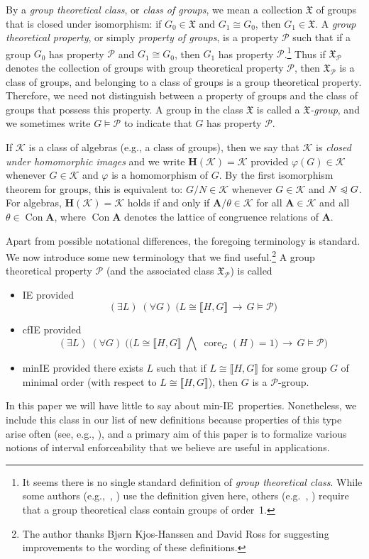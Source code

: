 \documentclass{gen-j-l}
\newcommand{\lb}{\ensuremath{\llbracket}}
\newcommand{\rb}{\ensuremath{\rrbracket}}
\newcommand{\<}{\ensuremath{\langle}}
\renewcommand{\>}{\ensuremath{\rangle}}
\theoremstyle{plain}
\theoremstyle{definition}
\theoremstyle{remark}
\numberwithin{theorem}{section}
\numberwithin{claim}{section}
\numberwithin{equation}{section}
\numberwithin{conjecture}{section}
\newcommand{\defn}[1]{\emph{#1}}
\newcommand{\subnormal}{\ensuremath{\trianglelefteqslant}}
\newcommand{\Meet}{\ensuremath{\bigwedge}}
\newcommand{\Con}{\ensuremath{\operatorname{Con}}}
\newcommand{\core}{\ensuremath{\operatorname{core}}}
\newcommand{\2}{\ensuremath{\mathbf{2}}}
\newcommand{\3}{\ensuremath{\mathbf{3}}}
\newcommand{\bA}{\ensuremath{\mathbf{A}}}
\newcommand{\sG}{\ensuremath{\mathfrak{X}}}
\newcommand{\bH}{\ensuremath{\mathbf{H}}}
\newcommand{\sK}{\ensuremath{\mathscr{K}}}
\newcommand{\cP}{\ensuremath{\mathcal{P}}}
\newcommand{\IE}{{\small IE}}
\renewcommand{\phi}{\ensuremath{\varphi}}
\begin{document}
By a \defn{group theoretical class}, or \defn{class of groups}, we mean a
collection $\sG$ of groups that is closed under isomorphism:
if $G_0\in \sG$ and  $G_1\cong G_0$, then $G_1\in \sG$.
A \defn{group theoretical property}, or simply \defn{property of groups},
is a property $\cP$ such that if a group $G_0$ has property $\cP$ and
$G_1\cong G_0$, then $G_1$ has property $\cP$.\footnote{It seems there
  is no single standard definition of \emph{group theoretical class}.
  While some authors (e.g.,~\cite{Doerk:1992}, \cite{BBE:2006}) use the definition given here,
  others (e.g.~\cite{Robinson:1996}, \cite{Rose:1978}) require that a group
theoretical class contain groups of order~1.}  
Thus if $\sG_{\cP}$ denotes the collection of groups with group theoretical
property $\cP$, then  $\sG_{\cP}$  is a class of groups, and belonging to a
class of groups is a group theoretical property.  Therefore, we need not
distinguish between a property of groups and the class of groups that possess
this property.
A group in the class $\sG$ is called a 
\emph{$\sG$-group}, and 
we sometimes write $G \vDash \cP$ to indicate
that $G$ has property $\cP$. %

If $\sK$ is a class of algebras (e.g., a class of groups), then we say that
$\sK$ is \emph{closed under homomorphic images} and we write $\bH(\sK) = \sK$
provided $\phi(G)\in \sK$ whenever $G\in \sK$ and $\phi$ is a homomorphism of
$G$. By the first isomorphism theorem for
  groups, this is equivalent to: 
$G/N\in \sK$ whenever $G\in \sK$ and $N\subnormal G$.  For algebras, 
$\bH(\sK) = \sK$ holds if and only if $\bA/\theta \in \sK$ for all $\bA\in \sK$
  and all $\theta \in \Con\bA$, where $\Con\bA$ denotes the lattice of
  congruence relations of $\bA$. 

Apart from possible notational differences, the foregoing terminology is
standard.  We now introduce some new terminology that we find
useful.\footnote{The author thanks Bj{\o}rn Kjos-Hanssen and David Ross for suggesting
  improvements to the wording of these definitions.}
A group theoretical property $\cP$  (and the associated class $\sG_\cP$) is called 
\begin{itemize}
\item 
\ac{IE} provided
\[
(\exists L)  \; (\forall G) \; \bigl(L\cong \lb H,G \rb \, \longrightarrow \, G \vDash \cP\bigr)
\]
\item
\ac{cfIE} provided
\[
(\exists L)  \; (\forall G) \; \bigl(\bigl(L\cong \lb H,G \rb \; \Meet \; \core_G(H)=1\bigr)
\, \longrightarrow \, G  \vDash \cP\bigr)
\]
\item 
\ac{minIE}
provided there exists $L$ such that if $L\cong \lb H,G \rb$ for some group $G$ of
minimal order (with respect to $L\cong \lb H,G \rb$), then
$G$ is a $\cP$-group.   
\end{itemize}
In this paper we will have little to
say about min-\IE\ properties.  Nonetheless, we include this class in our list
of new definitions because properties of this type arise often (see, e.g.,
\cite{Lucchini:1994a}), and a primary aim of this paper is to formalize
various notions of interval enforceability that we believe are
useful in applications. 
\end{document}
